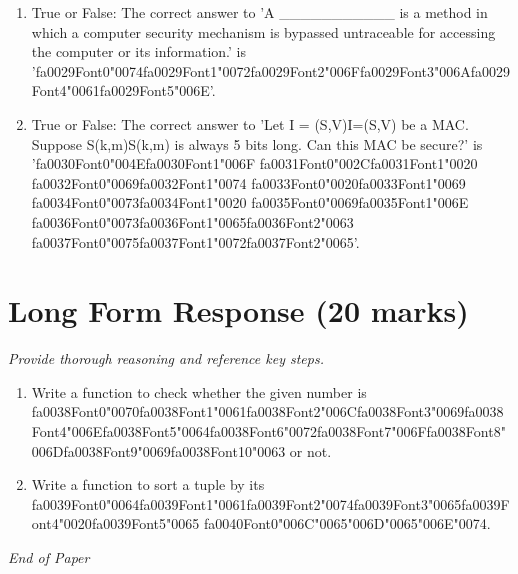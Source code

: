 \documentclass[12pt]{article}
\begin{document}
\begin{enumerate}[label=\arabic*.]
\item True or False: The correct answer to 'A \_\_\_\_\_\_\_\_\_\_\_ is a method in which a computer security mechanism is bypassed untraceable for accessing the computer or its information.' is '{\csname fa0029Font0\endcsname\char"0074}{\csname fa0029Font1\endcsname\char"0072}{\csname fa0029Font2\endcsname\char"006F}{\csname fa0029Font3\endcsname\char"006A}{\csname fa0029Font4\endcsname\char"0061}{\csname fa0029Font5\endcsname\char"006E}'.
\item True or False: The correct answer to 'Let I = (S,V)I=(S,V) be a MAC. Suppose S(k,m)S(k,m) is always 5 bits long. Can this MAC be secure?' is '{\csname fa0030Font0\endcsname\char"004E}{\csname fa0030Font1\endcsname\char"006F} {\csname fa0031Font0\endcsname\char"002C}{\csname fa0031Font1\endcsname\char"0020} {\csname fa0032Font0\endcsname\char"0069}{\csname fa0032Font1\endcsname\char"0074} {\csname fa0033Font0\endcsname\char"0020}{\csname fa0033Font1\endcsname\char"0069} {\csname fa0034Font0\endcsname\char"0073}{\csname fa0034Font1\endcsname\char"0020} {\csname fa0035Font0\endcsname\char"0069}{\csname fa0035Font1\endcsname\char"006E} {\csname fa0036Font0\endcsname\char"0073}{\csname fa0036Font1\endcsname\char"0065}{\csname fa0036Font2\endcsname\char"0063} {\csname fa0037Font0\endcsname\char"0075}{\csname fa0037Font1\endcsname\char"0072}{\csname fa0037Font2\endcsname\char"0065}'.
\end{enumerate}

\section*{Long Form Response (20 marks)}
\textit{Provide thorough reasoning and reference key steps.}
\begin{enumerate}[label=\arabic*.]
\item Write a function to check whether the given number is {\csname fa0038Font0\endcsname\char"0070}{\csname fa0038Font1\endcsname\char"0061}{\csname fa0038Font2\endcsname\char"006C}{\csname fa0038Font3\endcsname\char"0069}{\csname fa0038Font4\endcsname\char"006E}{\csname fa0038Font5\endcsname\char"0064}{\csname fa0038Font6\endcsname\char"0072}{\csname fa0038Font7\endcsname\char"006F}{\csname fa0038Font8\endcsname\char"006D}{\csname fa0038Font9\endcsname\char"0069}{\csname fa0038Font10\endcsname\char"0063} or not.
\item Write a function to sort a tuple by its {\csname fa0039Font0\endcsname\char"0064}{\csname fa0039Font1\endcsname\char"0061}{\csname fa0039Font2\endcsname\char"0074}{\csname fa0039Font3\endcsname\char"0065}{\csname fa0039Font4\endcsname\char"0020}{\csname fa0039Font5\endcsname\char"0065} {\csname fa0040Font0\endcsname\char"006C}{\char"0065}{\char"006D}{\char"0065}{\char"006E}{\char"0074}.
\end{enumerate}

\vfill
\noindent\textit{End of Paper}
\end{document}
